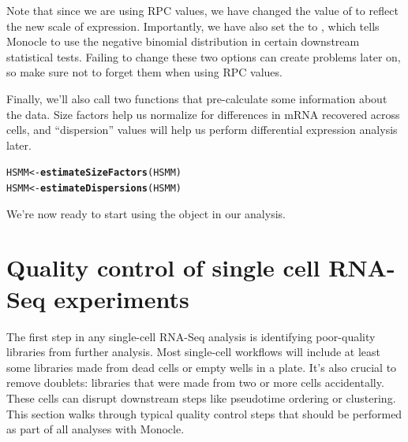 \documentclass[10pt,oneside]{article}\usepackage[]{graphicx}\usepackage[]{color}
\makeatletter
\newcommand{\hlstd}[1]{\textcolor[rgb]{0.345,0.345,0.345}{#1}}%
\newcommand{\hlkwb}[1]{\textcolor[rgb]{0.69,0.353,0.396}{#1}}%
\newcommand{\hlkwd}[1]{\textcolor[rgb]{0.737,0.353,0.396}{\textbf{#1}}}%
\newenvironment{kframe}{%
 \def\at@end@of@kframe{}%
 \ifinner\ifhmode%
  \def\at@end@of@kframe{\end{minipage}}%
  \begin{minipage}{\columnwidth}%
 \fi\fi%
 \def\FrameCommand##1{\hskip\@totalleftmargin \hskip-\fboxsep
 \colorbox{shadecolor}{##1}\hskip-\fboxsep
     \hskip-\linewidth \hskip-\@totalleftmargin \hskip\columnwidth}%
 \MakeFramed {\advance\hsize-\width
   \@totalleftmargin\z@ \linewidth\hsize
   \@setminipage}}%
 {\par\unskip\endMakeFramed%
 \at@end@of@kframe}
\newenvironment{knitrout}{}{} %
\makeatother
\begin{document}
Note that since we are using RPC values, we have changed the value of  to reflect the new scale of expression. Importantly, we have also set the  to , which tells Monocle to use the negative binomial distribution in certain downstream statistical tests. Failing to change these two options can create problems later on, so make sure not to forget them when using RPC values.

Finally, we'll also call two functions that pre-calculate some information about the data. Size factors help us normalize for differences in mRNA recovered across cells, and ``dispersion'' values will help us perform differential expression analysis later.
\begin{knitrout}
\color{fgcolor}\begin{kframe}
\begin{alltt}
\hlstd{HSMM} \hlkwb{<-} \hlkwd{estimateSizeFactors}\hlstd{(HSMM)}
\hlstd{HSMM} \hlkwb{<-} \hlkwd{estimateDispersions}\hlstd{(HSMM)}
\end{alltt}
\end{kframe}
\end{knitrout}
We're now ready to start using the  object in our analysis.

\section{Quality control of single cell RNA-Seq experiments}
The first step in any single-cell RNA-Seq analysis is identifying poor-quality libraries from further analysis. Most single-cell workflows will include at least some libraries made from dead cells or empty wells in a plate. It's also crucial to remove doublets: libraries that were made from two or more cells accidentally. These cells can disrupt downstream steps like pseudotime ordering or clustering. This section walks through typical quality control steps that should be performed as part of all analyses with Monocle.
\end{document}
